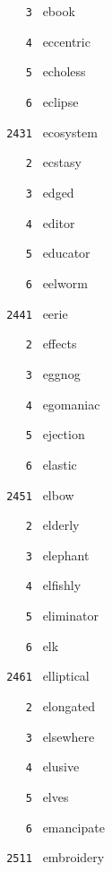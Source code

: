 \documentclass[11pt]{article}
\begin{document}
\begin{multicols}{6}
\noindent \texttt{ \ \ \ 3 } ebook  \par
\noindent \texttt{ \ \ \ 4 } eccentric  \par
\noindent \texttt{ \ \ \ 5 } echoless  \par
\noindent \texttt{ \ \ \ 6 } eclipse  \par
\vspace{3mm}
\noindent \texttt{ 2431 } ecosystem  \par
\noindent \texttt{ \ \ \ 2 } ecstasy  \par
\noindent \texttt{ \ \ \ 3 } edged  \par
\noindent \texttt{ \ \ \ 4 } editor  \par
\noindent \texttt{ \ \ \ 5 } educator  \par
\noindent \texttt{ \ \ \ 6 } eelworm  \par
\vspace{3mm}
\noindent \texttt{ 2441 } eerie  \par
\noindent \texttt{ \ \ \ 2 } effects  \par
\noindent \texttt{ \ \ \ 3 } eggnog  \par
\noindent \texttt{ \ \ \ 4 } egomaniac  \par
\noindent \texttt{ \ \ \ 5 } ejection  \par
\noindent \texttt{ \ \ \ 6 } elastic  \par
\vspace{3mm}
\noindent \texttt{ 2451 } elbow  \par
\noindent \texttt{ \ \ \ 2 } elderly  \par
\noindent \texttt{ \ \ \ 3 } elephant  \par
\noindent \texttt{ \ \ \ 4 } elfishly  \par
\noindent \texttt{ \ \ \ 5 } eliminator  \par
\noindent \texttt{ \ \ \ 6 } elk  \par
\vspace{3mm}
\noindent \texttt{ 2461 } elliptical  \par
\noindent \texttt{ \ \ \ 2 } elongated  \par
\noindent \texttt{ \ \ \ 3 } elsewhere  \par
\noindent \texttt{ \ \ \ 4 } elusive  \par
\noindent \texttt{ \ \ \ 5 } elves  \par
\noindent \texttt{ \ \ \ 6 } emancipate  \par
\noindent \texttt{ 2511 } embroidery  \par

\end{multicols}
\end{document}

